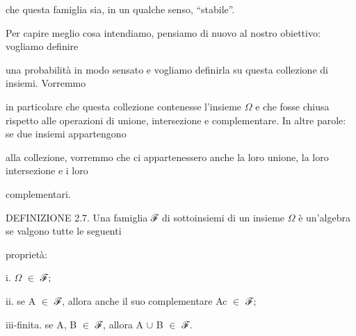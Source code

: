 \documentclass[a4paper,portrait,12pt]{article}
\begin{document}
\begin{flushleft}
che questa famiglia sia, in un qualche senso, {``}stabile''.
\end{flushleft}


\begin{flushleft}
Per capire meglio cosa intendiamo, pensiamo di nuovo al nostro obiettivo: vogliamo definire
\end{flushleft}


\begin{flushleft}
una probabilit\`{a} in modo sensato e vogliamo definirla su questa collezione di insiemi. Vorremmo
\end{flushleft}


\begin{flushleft}
in particolare che questa collezione contenesse l'insieme $\Omega$ e che fosse chiusa rispetto alle operazioni di unione, intersezione e complementare. In altre parole: se due insiemi appartengono
\end{flushleft}


\begin{flushleft}
alla collezione, vorremmo che ci appartenessero anche la loro unione, la loro intersezione e i loro
\end{flushleft}


\begin{flushleft}
complementari.
\end{flushleft}


\begin{flushleft}
DEFINIZIONE 2.7. Una famiglia ℱ di sottoinsiemi di un insieme $\Omega$ \`{e} un'algebra se valgono tutte le seguenti
\end{flushleft}


\begin{flushleft}
propriet\`{a}:
\end{flushleft}





\begin{flushleft}
i. $\Omega$ $\in$ ℱ;
\end{flushleft}


\begin{flushleft}
ii. se A $\in$ ℱ, allora anche il suo complementare Ac $\in$ ℱ;
\end{flushleft}


\begin{flushleft}
iii-finita. se A, B $\in$ ℱ, allora A $\cup$ B $\in$ ℱ.
\end{flushleft}
\end{document}
